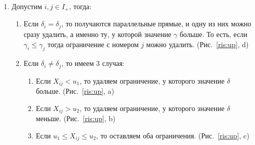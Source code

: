 \documentclass[12pt,a4paper]{article}
\begin{document}
\begin{enumerate}


\newpage
\item Допустим $i,j \in I_{+}$, тогда: \par
\begin{enumerate}
\item Если $\delta_{i}=\delta_{j}$, то получаются параллельные прямые, и одну из них можно сразу удалить, а именно ту, у которой значение $\gamma$ больше. То есть, если $\gamma_{i}\leqslant \gamma_{j}$ тогда ограничение с номером $j$ можно удалить. (Рис.~\ref{ris:up}, d)
\item Если $\delta_{i}\not=\delta_{j}$, то имеем 3 случая:
\begin{enumerate}
\item Если $X_{ij}<u_{1}$, то удаляем ограничение, у которого значение $\delta$ больше. (Рис.~\ref{ris:up}, a)
\item Если $X_{ij}>u_{2}$, то удаляем ограничение, у которого значение $\delta$ меньше. (Рис.~\ref{ris:up}, b)
\item Если $u_{1}\leqslant X_{ij}\leqslant u_{2}$, то оставляем оба ограничения. (Рис.~\ref{ris:up}, c)
\end{enumerate}
\end{enumerate}


\end{enumerate}
\end{document}
